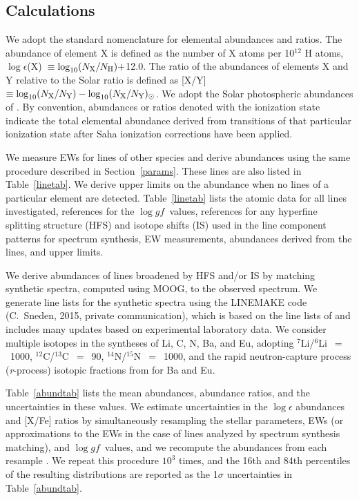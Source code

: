 \documentclass[twocolumn,tighten]{aastex62}
\newcommand{\loggf}{\mbox{$\log gf$}}
\newcommand{\rpro}{\mbox{{\it r}-process}}
\begin{document}
\subsection{Calculations}
\label{abundcalc}


We adopt the standard nomenclature 
for elemental abundances and ratios.
The abundance of element X is defined
as the number of X atoms per 10$^{12}$ H atoms,
$\log\epsilon$(X)~$\equiv \log_{10}(N_{\rm X}/N_{\rm H})+$12.0.
The ratio of the abundances of elements X and Y relative to the
Solar ratio is defined as
[X/Y] $\equiv \log_{10} (N_{\rm X}/N_{\rm Y}) - \log_{10} (N_{\rm X}/N_{\rm Y})_{\odot}$.
We adopt the Solar photospheric abundances of \citet{asplund09}.
By convention,
abundances or ratios denoted with the ionization state
indicate
the total elemental abundance derived from transitions of
that particular ionization state 
after Saha ionization corrections have been applied.

We measure EWs for lines of other species
and derive abundances
using the same procedure described in Section~\ref{params}.
These lines are also listed in Table~\ref{linetab}.
We derive upper limits on the abundance when no
lines of a particular element are detected.
Table~\ref{linetab} lists the atomic data for all lines investigated,
references for the \loggf\ values,
references for any hyperfine splitting structure (HFS) and 
isotope shifts (IS) 
used in the line component patterns for spectrum synthesis,
EW measurements,
abundances derived from the lines,
and 
upper limits.

We derive abundances of lines broadened by HFS and/or IS
by matching synthetic spectra,
computed using MOOG, to the observed spectrum.
We generate line lists for the synthetic spectra using the LINEMAKE code 
(C.\ Sneden, 2015, private communication),
which is based on the line lists of \citet{kurucz11}
and includes many updates based on 
experimental laboratory data.
We consider multiple isotopes in the syntheses of 
Li, C, N, Ba, and Eu, adopting
$^{7}$Li/$^{6}$Li~$=$~1000,
$^{12}$C/$^{13}$C~$=$~90,
$^{14}$N/$^{15}$N~$=$~1000,
and the rapid neutron-capture process
(\rpro) isotopic fractions from \citet{sneden08}
for Ba and Eu.

Table~\ref{abundtab} lists the mean abundances,
abundance ratios, and the uncertainties in these values.
We estimate uncertainties in the $\log\epsilon$ abundances
and [X/Fe] ratios by simultaneously 
resampling the stellar parameters, 
EWs (or approximations to the EWs in the case of lines
analyzed by spectrum synthesis matching), and \loggf\ values,
and we recompute the abundances from each resample
\citep{roederer18c}.
We repeat this procedure $10^{3}$ times, and the
16th and 84th percentiles
of the resulting distributions are reported as the 
1$\sigma$ uncertainties
in Table~\ref{abundtab}.
\end{document}
